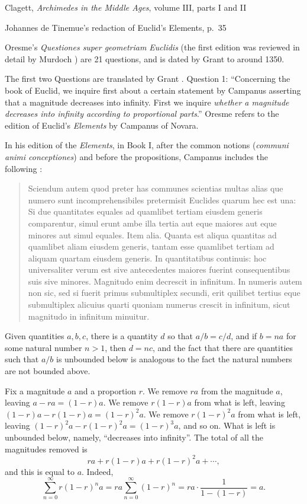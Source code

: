 \documentclass{article}
\theoremstyle{definition}
\begin{document}
Clagett, {\em Archimedes in the Middle Ages}, volume III, parts I and II

Johannes de Tinemue's redaction of Euclid's Elements, p.~35



Oresme's {\em Questiones super geometriam Euclidis} \cite{busard2010} (the first edition was reviewed in detail by Murdoch \cite[p.~69]{murdoch1964}) are 21 questions, and is dated by Grant to around 1350. 





The first two Questions are translated by Grant \cite[pp.~131--135]{grant1974}. Question 1:
``Concerning the book of Euclid, we inquire first about a certain statement by Campanus asserting that a magnitude decreases into infinity. First we inquire {\em whether a magnitude
decreases into infinity according to  proportional parts}.'' Oresme refers to the edition of Euclid's {\em Elements} by Campanus of Novara.

In his edition of the {\em Elements}, in Book I, after the common notions ({\em communi animi conceptiones})
and before the propositions, Campanus includes the following \cite[pp.~58--59]{campanus}:

\begin{quote}
Sciendum autem quod preter has communes scientias multas alias que numero sunt incomprehensibiles pretermisit Euclides
quarum hec est una: Si due quantitates equales ad quamlibet tertiam eiusdem generis comparentur, simul erunt ambe illa tertia aut eque maiores
aut eque minores aut simul equales. Item alia. Quanta est aliqua quantitas ad quamlibet aliam eiusdem generis,
tantam esse quamlibet tertiam ad aliquam quartam eiusdem generis. In quantitatibus continuis: hoc universaliter verum
est sive antecedentes maiores fuerint consequentibus suis sive minores. Magnitudo enim decrescit in infinitum. In numeris autem non sic,
sed si fuerit primus submultiplex secundi, erit quilibet tertius eque submultiplex alicuius quarti quoniam numerus crescit in infinitum, sicut magnitudo
in infinitum minuitur.
\end{quote}


Given quantities $a,b,c$, there is a quantity $d$ so that $a/b=c/d$, and if $b=na$ for some natural number $n>1$, then 
$d=nc$, and the fact that there are quantities such that $a/b$ is unbounded below is analogous to the fact the natural numbers are not bounded
above. 

Fix a magnitude $a$ and a proportion $r$. We remove $ra$ from the  magnitude $a$, leaving $a-ra=(1-r)a$. We remove $r(1-r)a$ from what is left,
leaving $(1-r)a-r(1-r)a=(1-r)^2a$. We remove $r(1-r)^2a$ from what is left, leaving $(1-r)^2a - r(1-r)^2a=(1-r)^3a$, and so on. What is left is unbounded below,
namely, ``decreases into infinity''. The total of all the magnitudes removed is
\[
ra+r(1-r)a + r(1-r)^2a + \cdots,
\]
and this is equal to $a$. Indeed,
\[
\sum_{n=0}^\infty r(1-r)^n a = ra \sum_{n=0}^\infty (1-r)^n = ra \cdot \frac{1}{1-(1-r)} = a.
\]
\end{document}
